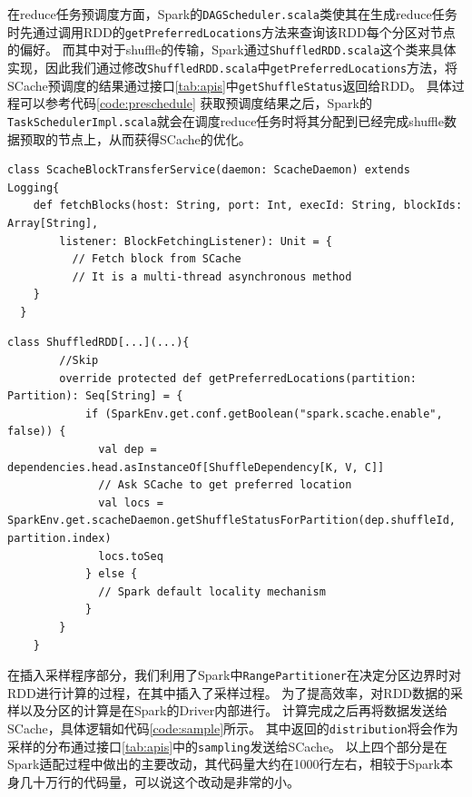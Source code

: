 在reduce任务预调度方面，Spark的\verb|DAGScheduler.scala|类使其在生成reduce任务时先通过调用RDD的\verb|getPreferredLocations|方法来查询该RDD每个分区对节点的偏好。
而其中对于shuffle的传输，Spark通过\verb|ShuffledRDD.scala|这个类来具体实现，因此我们通过修改\verb|ShuffledRDD.scala|中\verb|getPreferredLocations|方法，将SCache预调度的结果通过接口\ref{tab:apis}中\verb|getShuffleStatus|返回给RDD。
具体过程可以参考代码\ref{code:preschedule}
获取预调度结果之后，Spark的\verb|TaskSchedulerImpl.scala|就会在调度reduce任务时将其分配到已经完成shuffle数据预取的节点上，从而获得SCache的优化。

\begin{lstlisting}[style={myScalastyle}, caption={ScacheBlockTransferService代码片段}, label={code:reader}]
  class ScacheBlockTransferService(daemon: ScacheDaemon) extends Logging{
    def fetchBlocks(host: String, port: Int, execId: String, blockIds: Array[String],
        listener: BlockFetchingListener): Unit = {
          // Fetch block from SCache
          // It is a multi-thread asynchronous method 
    }
  }
\end{lstlisting}
\begin{lstlisting}[style={myScalastyle}, caption={Reduce预调度代码片段}, label={code:preschedule}]
    class ShuffledRDD[...](...){
        //Skip
        override protected def getPreferredLocations(partition: Partition): Seq[String] = {
            if (SparkEnv.get.conf.getBoolean("spark.scache.enable", false)) {
              val dep = dependencies.head.asInstanceOf[ShuffleDependency[K, V, C]]
              // Ask SCache to get preferred location
              val locs = SparkEnv.get.scacheDaemon.getShuffleStatusForPartition(dep.shuffleId, partition.index)
              locs.toSeq
            } else {
              // Spark default locality mechanism
            }
        }
    }
\end{lstlisting}

在插入采样程序部分，我们利用了Spark中\verb|RangePartitioner|在决定分区边界时对RDD进行计算的过程，在其中插入了采样过程。
为了提高效率，对RDD数据的采样以及分区的计算是在Spark的Driver内部进行。
计算完成之后再将数据发送给SCache，具体逻辑如代码\ref{code:sample}所示。
其中返回的\verb|distribution|将会作为采样的分布通过接口\ref{tab:apis}中的\verb|sampling|发送给SCache。
以上四个部分是在Spark适配过程中做出的主要改动，其代码量大约在1000行左右，相较于Spark本身几十万行的代码量，可以说这个改动是非常的小。

